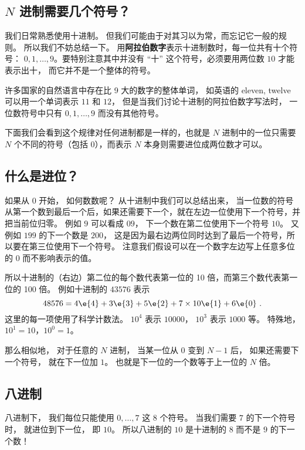 
\begin{issues}
\issueDraft
\end{issues}

\subsection{$N$ 进制需要几个符号？}
我们日常熟悉使用十进制。 但我们可能由于对其习以为常，而忘记它一般的规则。 所以我们不妨总结一下。 用\textbf{阿拉伯数字}表示十进制数时，每一位共有十个符号： $0,1,\dots, 9$。要特别注意其中并没有 “十” 这个符号，必须要用两位数 $10$ 才能表示出十， 而它并不是一个整体的符号。

许多国家的自然语言中存在比 9 大的数字的整体单词， 如英语的 eleven, twelve 可以用一个单词表示 $11$ 和 $12$， 但是当我们讨论十进制的阿拉伯数字写法时， 一位数符号中只有 $0,1,\dots, 9$ 而没有其他符号。 

下面我们会看到这个规律对任何进制都是一样的，也就是 $N$ 进制中的一位只需要 $N$ 个不同的符号（包括 0），而表示 $N$ 本身则需要进位成两位数才可以。

\subsection{什么是进位？}
如果从 $0$ 开始， 如何数数呢？ 从十进制中我们可以总结出来， 当一位数的符号从第一个数到最后一个后，如果还需要下一个，就在左边一位使用下一个符号，并把当前位归零。 例如 $9$ 可以看成 $09$， 下一个数在第二位使用下一个符号 $10$。 又例如 $199$ 的下一个数是 $200$， 这是因为最右边两位同时达到了最后一个符号，所以要在第三位使用下一个符号。 注意我们假设可以在一个数字左边写上任意多位的 $0$ 而不影响表示的值。

所以十进制的（右边）第二位的每个数代表第一位的 10 倍，而第三个数代表第一位的 100 倍。 例如十进制的 $43576$ 表示
\begin{equation}\label{eq_Binary_1}
48576 = 4\e{4} + 3\e{3} + 5\e{2} + 7\times 10\e{1} + 6\e{0}~.
\end{equation}
这里的每一项使用了科学计数法。%
$10^4$ 表示 $10000$， $10^3$ 表示 $1000$ 等。 特殊地， $10^1=10$，$10^0=1$。

那么相似地， 对于任意的 $N$ 进制， 当某一位从 $0$ 变到 $N-1$ 后， 如果还需要下一个符号， 就在下一位加 $1$。 也就是下一位的一个数等于上一位的 $N$ 倍。

\subsection{八进制}
八进制下， 我们每位只能使用 $0,\dots,7$ 这 $8$ 个符号。 当我们需要 $7$ 的下一个符号时， 就进位到下一位， 即 $10$。 所以八进制的 $10$ 是十进制的 $8$ 而不是 $9$ 的下一个数！

